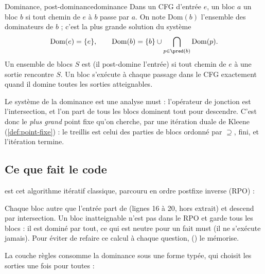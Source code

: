 \begin{definition}{Dominance, post-dominance}{dominance}
  Dans un CFG d'entrée $e$, un bloc $a$  un bloc $b$ si tout
  chemin de $e$ à $b$ passe par $a$. On note $\mathrm{Dom}(b)$ l'ensemble des
  dominateurs de $b$ ; c'est la plus grande solution du système
  \[ \mathrm{Dom}(e) = \{e\}, \qquad
     \mathrm{Dom}(b) = \{b\} \cup \bigcap_{p \in \pred(b)} \mathrm{Dom}(p). \]
  Un ensemble de blocs $S$ est  (il post-domine
  l'entrée) si tout chemin de $e$ à une sortie rencontre $S$. Un bloc
  s'exécute à chaque passage dans le CFG exactement quand il domine toutes
  les sorties atteignables.
\end{definition}

Le système de la dominance est une analyse must : l'opérateur de jonction est
l'intersection, et l'on part de \og tous les blocs dominent tout\fg{} pour
descendre. C'est donc le \emph{plus grand} point fixe qu'on cherche, par une
itération duale de Kleene (\cref{def:point-fixe}) : le treillis est celui des
parties de blocs ordonné par $\supseteq$, fini, et l'itération termine.

\subsection{Ce que fait le code}

 est cet algorithme itératif classique, parcouru en
ordre postfixe inverse (RPO) :


Chaque bloc autre que l'entrée part de  (lignes 16 à 20,
hors extrait) et descend par intersection. Un bloc inatteignable n'est pas
dans le RPO et garde \og tous les blocs\fg{} : il est dominé par tout, ce qui
est neutre pour un fait must (il ne s'exécute jamais). Pour éviter de refaire
ce calcul à chaque question, 
() le mémorise.

La couche règles consomme la dominance sous une forme typée, qui choisit les
sorties une fois pour toutes :


